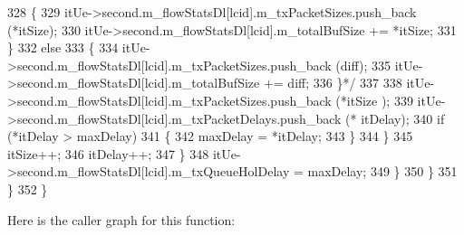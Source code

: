 \begin{DoxyCode}
328 \textcolor{comment}{                                        \{}
329 \textcolor{comment}{                                                itUe->second.m\_flowStatsDl[lcid].m\_txPacketSizes.push\_back
       (*itSize);}
330 \textcolor{comment}{                                                itUe->second.m\_flowStatsDl[lcid].m\_totalBufSize += *itSize;}
331 \textcolor{comment}{                                        \}}
332 \textcolor{comment}{                                        else}
333 \textcolor{comment}{                                        \{}
334 \textcolor{comment}{                                                itUe->second.m\_flowStatsDl[lcid].m\_txPacketSizes.push\_back
       (diff);}
335 \textcolor{comment}{                                                itUe->second.m\_flowStatsDl[lcid].m\_totalBufSize += diff;}
336 \textcolor{comment}{                                        \}*/}
337 
338                                         itUe->second.m\_flowStatsDl[lcid].m\_txPacketSizes.push\_back (*itSize
      );
339                                         itUe->second.m\_flowStatsDl[lcid].m\_txPacketDelays.push\_back (*
      itDelay);
340                                         \textcolor{keywordflow}{if} (*itDelay > maxDelay)
341                                         \{
342                                                 maxDelay = *itDelay;
343                                         \}
344                                 \}
345                                 itSize++;
346                                 itDelay++;
347                         \}
348                         itUe->second.m\_flowStatsDl[lcid].m\_txQueueHolDelay = maxDelay;
349                 \}
350         \}
351   \}
352 \}
\end{DoxyCode}


Here is the caller graph for this function\+:


